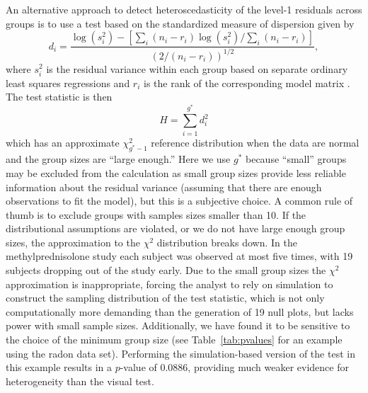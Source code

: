 \documentclass[12pt]{article}
\newcommand{\alnote}[1]{\todo[inline,color=green!40]{#1}} %
\newcommand{\hhnote}[1]{\todo[inline,color=orange!40]{#1}}
\begin{document}
An alternative approach to detect heteroscedasticity of the level-1 residuals across groups is to use a test based on the standardized measure of dispersion given by
%
\begin{equation}\label{eq:d}
	d_i = \frac{\log\left( s_i^2 \right) - \left[ \sum_i (n_i - r_i) \log\left( s_i^2 \right) / \sum_i  (n_i - r_i) \right]}{\left(2 / (n_i - r_i)\right)^{1/2}},
\end{equation}
%
where $s_i^2$ is the residual variance within each group based on separate ordinary least squares regressions and $r_i$ is the rank of the corresponding model matrix  \citep{Raudenbush:2002}. The test statistic is then
%
\begin{equation}
	H = \sum_{i=1}^{g^*} d_i^2
\end{equation}
%
which has an approximate $\chi^2_{g^*-1}$ reference distribution when the data are normal and the group sizes are ``large enough.'' Here we use $g^*$ because ``small'' groups may be excluded from the calculation as small group sizes provide less reliable information about the residual variance (assuming that there are enough observations to fit the model), but this is a subjective choice. A common rule of thumb is to exclude groups with samples sizes smaller than 10. If the distributional assumptions are violated, or we do not have large enough group sizes,  the approximation to the $\chi^2$ distribution breaks down. In the methylprednisolone study each subject was observed at most five times, with 19 subjects dropping out of the study early. Due to the small group sizes the $\chi^2$ approximation is inappropriate, forcing the analyst to rely on simulation to construct the sampling distribution of the test statistic, which is not only computationally more demanding than the generation of 19 null plots, but lacks power with small sample sizes. Additionally, we have found it to be sensitive to the choice of the minimum group size (see Table~\ref{tab:pvalues} for an example using the radon data set). Performing the simulation-based version of the test in this example results in a $p$-value of 0.0886, providing much weaker evidence for heterogeneity than the visual test. 

%
\end{document}
